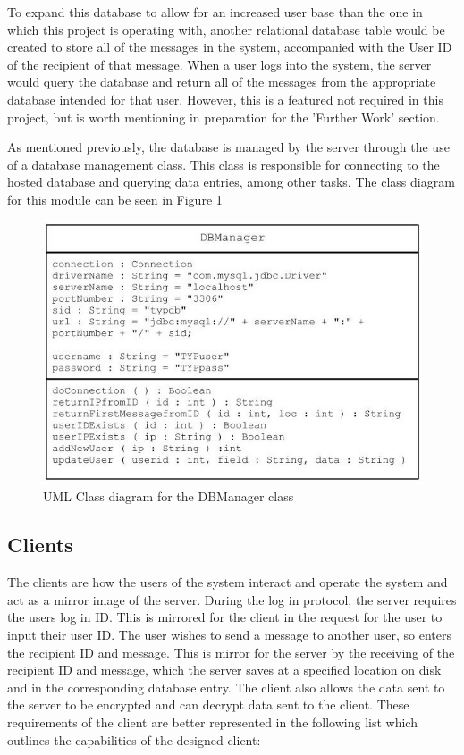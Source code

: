 \documentclass[a4paper,10pt]{report}
\begin{document}
To expand this database to allow for an increased user base than the one in which this project is operating with, another relational database table would be created to store all of the messages in the system, accompanied with the User ID of the recipient of that message. When a user logs into the system, the server would query the database and return all of the messages from the appropriate database intended for that user. However, this is a featured not required in this project, but is worth mentioning in preparation for the 'Further Work' section. 

As mentioned previously, the database is managed by the server through the use of a database management class. This class is responsible for connecting to the hosted database and querying data entries, among other tasks. The class diagram for this module can be seen in Figure \ref{fig:dbmanclass}

\begin{figure}[htb]
\centering
\includegraphics[scale=0.4]{images/dbmanagerclass.jpg}
\caption{UML Class diagram for the DBManager class}
\label{fig:dbmanclass}
\end{figure}

\subsection{Clients}

The clients are how the users of the system interact and operate the system and act as a mirror image of the server. During the log in protocol, the server requires the users log in ID. This is mirrored for the client in the request for the user to input their user ID. The user wishes to send a message to another user, so enters the recipient ID and message. This is mirror for the server by the receiving of the recipient ID and message, which the server saves at a specified location on disk and in the corresponding database entry. The client also allows the data sent to the server to be encrypted and can decrypt data sent to the client. These requirements of the client are better represented in the following list which outlines the capabilities of the designed client:
\end{document}
